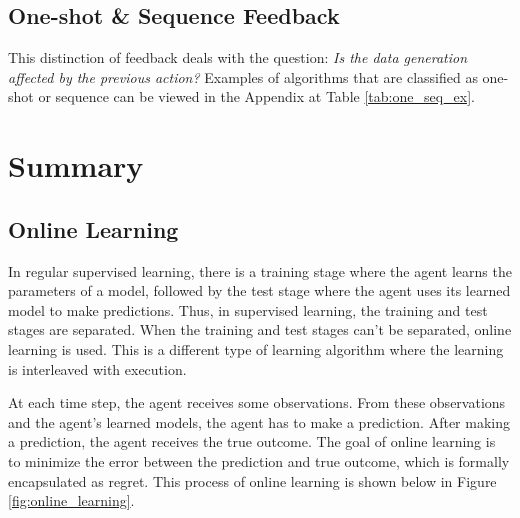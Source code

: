 \documentclass[11pt]{article}
\begin{document}

\normalfont 

\subsection{One-shot \& Sequence Feedback} 
This distinction of feedback deals with the question: \emph{Is the data generation affected by the previous action?} Examples of algorithms that are classified as one-shot or sequence can be viewed in the Appendix at Table \ref{tab:one_seq_ex}.



\normalfont 





\section{Summary}
\subsection{Online Learning}
\normalfont
In regular supervised learning, there is a training stage where the agent learns the parameters of a model, followed by the test stage where the agent uses its learned model to make predictions. Thus, in supervised learning, the training and test stages are separated. When the training and test stages can't be separated, online learning is used. This is a different type of learning algorithm where the learning is interleaved with execution. 

At each time step, the agent receives some observations. From these observations and the agent's learned models, the agent has to make a prediction. After making a prediction, the agent receives the true outcome. The goal of online learning is to minimize the error between the prediction and true outcome, which is formally encapsulated as regret. This process of online learning is shown below in Figure \ref{fig:online_learning}. 
\end{document}
